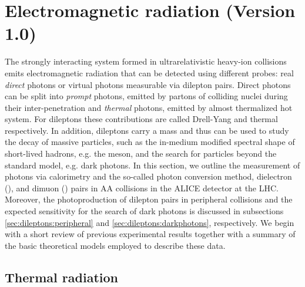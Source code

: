 \documentclass[../report.tex]{subfiles}
\begin{document}
\section{Electromagnetic radiation (Version 1.0)}

\label{sec:em}



The strongly interacting system formed in ultrarelativistic heavy-ion collisions 
emits electromagnetic radiation that can be detected using different probes: real {\it direct} photons %
or virtual photons measurable via dilepton pairs. 
Direct photons can be split into {\it prompt} photons, emitted by partons of colliding nuclei during their inter-penetration and {\it thermal} photons, emitted by almost thermalized hot system. 
For dileptons these contributions are called Drell-Yang and thermal respectively.
In addition, dileptons carry a mass and thus can be used to study the decay of massive particles, such as the in-medium modified spectral shape of short-lived hadrons, e.g. the \Prho meson, and the search for particles beyond the standard model, e.g. dark photons. In this section, we outline the measurement of photons via calorimetry and the so-called photon conversion method, dielectron (\Pepem), and dimuon (\PGmpGmm) pairs in AA collisions in the ALICE detector at the LHC. Moreover, the photoproduction of dilepton pairs in peripheral collisions and the expected sensitivity for the search of dark photons is discussed in subsections \ref{sec:dileptons:peripheral} and \ref{sec:dileptons:darkphotons}, respectively. We begin with a short review of previous experimental results together with a summary of the basic theoretical models employed to describe these data.


\subsection{Thermal radiation}
\end{document}
